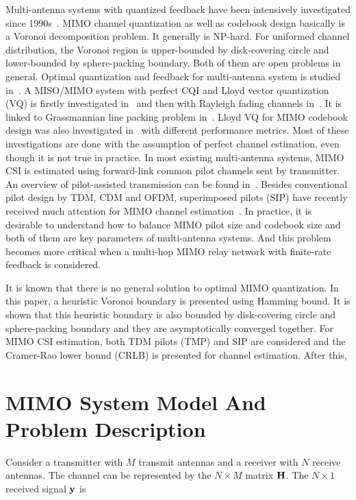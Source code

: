 \documentclass[10pt,fleqn, twocolumn]{IEEEtran}
\newcommand{\bH}{{\bf H}}
\newcommand{\by}{{\bf y}}
\begin{document}
Multi-antenna systems with quantized feedback have been
intensively investigated since 1990s~\cite{Gerlach94}. MIMO
channel quantization as well as codebook design basically is a
Voronoi decomposition problem. It generally is NP-hard. For
uniformed channel distribution, the Voronoi region is
upper-bounded by disk-covering circle and lower-bounded by
sphere-packing boundary. Both of them are open problems in
general. Optimal quantization and feedback for multi-antenna
system is studied in~\cite{Skog03,Lau04}. A MISO/MIMO system with
perfect CQI and Lloyd vector quantization (VQ) is firstly
investigated in~\cite{Narula98} and then with Rayleigh fading
channels in~\cite{Mukka03}. It is linked to Grassmannian line
packing problem in~\cite{Love02}. Lloyd VQ for MIMO codebook
design was also investigated in~\cite{PXia04,Roh04} with different
performance metrics. Most of these investigations are done with
the assumption of perfect channel estimation, even though it is
not true in practice. In most existing multi-antenna systems, MIMO
CSI is estimated using forward-link common pilot channels sent by
transmitter. An overview of pilot-assisted transmission can be
found in~\cite{Tong04}. Besides conventional pilot design by TDM,
CDM and OFDM, superimposed pilots (SIP) have recently received
much attention for MIMO channel estimation~\cite{Coldrey06}. In
practice, it is desirable to understand how to balance MIMO pilot
size and codebook size and both of them are key parameters of
multi-antenna systems. And this problem becomes more critical when
a multi-hop MIMO relay network with finite-rate feedback is
considered.

It is known that there is no general solution to optimal MIMO
quantization. In this paper, a heuristic Voronoi boundary is
presented using Hamming bound. It is shown that this heuristic
boundary is also bounded by disk-covering circle and
sphere-packing boundary and they are asymptotically converged
together. For MIMO CSI estimation, both TDM pilots (TMP) and SIP
are considered and the Cramer-Rao lower bound (CRLB) is presented
for channel estimation. After this,

\section{MIMO System Model And Problem Description\label{MIMO_system_model}}

Consider a transmitter with $M$ transmit antennas and a receiver
with $N$ receive antennas. The channel can be represented by the
$N\times M$ matrix $\bH$. The $N\times 1$ received signal $\by$ is
\end{document}
